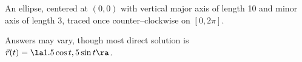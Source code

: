{An ellipse, centered at $(0,0)$ with vertical major axis of length 10 and minor axis of length 3, traced once counter--clockwise on $[0,2\pi]$. 
}
{
Answers may vary, though most direct solution is\\
$\vec r(t) = \la 1.5\cos t,5\sin t\ra$.

}

